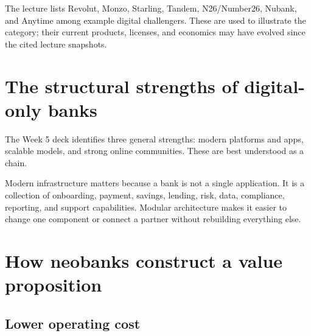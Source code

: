The lecture lists Revolut, Monzo, Starling, Tandem, N26/Number26, Nubank, and Anytime among example digital challengers. These are used to illustrate the category; their current products, licenses, and economics may have evolved since the cited lecture snapshots.

\section{The structural strengths of digital-only banks}

The Week 5 deck identifies three general strengths: modern platforms and apps, scalable models, and strong online communities. These are best understood as a chain.

\begin{mlfigure}
\end{mlfigure}

Modern infrastructure matters because a bank is not a single application. It is a collection of onboarding, payment, savings, lending, risk, data, compliance, reporting, and support capabilities. Modular architecture makes it easier to change one component or connect a partner without rebuilding everything else.

\section{How neobanks construct a value proposition}

\subsection{Lower operating cost}

